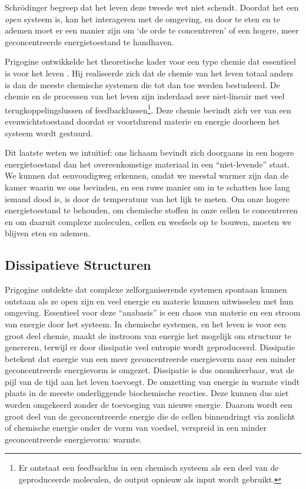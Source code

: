 \documentclass[
  11pt,
]{book}
\begin{document}
Schrödinger begreep dat het leven deze tweede wet niet schendt. Doordat het een \emph{open} systeem is, kan het interageren met de omgeving, en door te eten en te ademen moet er een manier zijn om `de orde te concentreren' of een hogere, meer geconcentreerde energietoestand te handhaven.

Prigogine ontwikkelde het theoretische kader voor een type chemie dat essentieel is voor het leven \citep{prigogineStengers1984}. Hij realiseerde zich dat de chemie van het leven totaal anders is dan de meeste chemische systemen die tot dan toe werden bestudeerd. De chemie en de processen van het leven zijn inderdaad zeer niet-lineair met veel terugkoppelingslussen of feedbacklussen\footnote{Er ontstaat een feedbacklus in een chemisch systeem als een deel van de geproduceerde moleculen, de output opnieuw als input wordt gebruikt.}. Deze chemie bevindt zich ver van een evenwichtstoestand doordat er voortdurend materie en energie doorheen het systeem wordt gestuurd.

Dit laatste weten we intuïtief: ons lichaam bevindt zich doorgaans in een hogere energietoestand dan het overeenkomstige materiaal in een ``niet-levende'' staat. We kunnen dat eenvoudigweg erkennen, omdat we meestal warmer zijn dan de kamer waarin we ons bevinden, en een ruwe manier om in te schatten hoe lang iemand dood is, is door de temperatuur van het lijk te meten. Om onze hogere energietoestand te behouden, om chemische stoffen in onze cellen te concentreren en om daaruit complexe moleculen, cellen en weefsels op te bouwen, moeten we blijven eten en ademen.

\pagebreak

\hypertarget{dissipatieve-structuren}{%
\subsection{Dissipatieve Structuren}\label{dissipatieve-structuren}}

Prigogine ontdekte dat complexe zelforganiserende systemen spontaan kunnen ontstaan als ze open zijn en veel energie en materie kunnen uitwisselen met hun omgeving. Essentieel voor deze ``anabasis'' is een chaos van materie en een stroom van energie door het systeem. In chemische systemen, en het leven is voor een groot deel chemie, maakt de instroom van energie het mogelijk om structuur te genereren, terwijl er door dissipatie veel entropie wordt geproduceerd. Dissipatie betekent dat energie van een meer geconcentreerde energievorm naar een minder geconcentreerde energievorm is omgezet. Dissipatie is dus onomkeerbaar, wat de pijl van de tijd aan het leven toevoegt. De omzetting van energie in warmte vindt plaats in de meeste onderliggende biochemische reacties. Deze kunnen dus niet worden omgekeerd zonder de toevoeging van nieuwe energie. Daarom wordt een groot deel van de geconcentreerde energie die de cellen binnendringt via zonlicht of chemische energie onder de vorm van voedsel, verspreid in een minder geconcentreerde energievorm: warmte.
\end{document}
